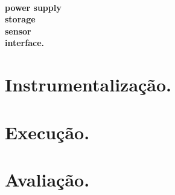 \textbf{\\ power supply \\
storage \\
sensor \\ 
interface.}




\section{Instrumentalização.}
\section{Execução.}
\section{Avaliação.}
 